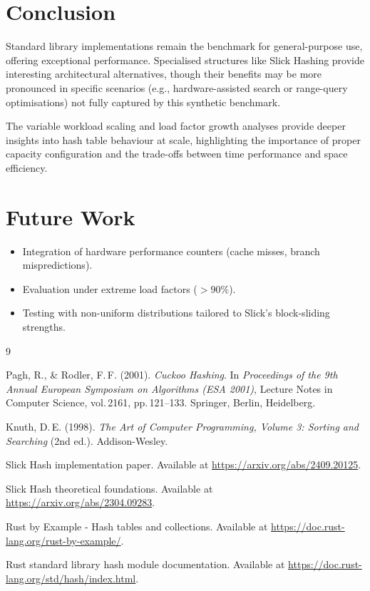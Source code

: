\documentclass[11pt,a4paper]{article}
\begin{document}
\section{Conclusion}

Standard library implementations remain the benchmark for general-purpose use, offering exceptional performance. Specialised structures like Slick Hashing provide interesting architectural alternatives, though their benefits may be more pronounced in specific scenarios (e.g., hardware-assisted search or range-query optimisations) not fully captured by this synthetic benchmark.

The variable workload scaling and load factor growth analyses provide deeper insights into hash table behaviour at scale, highlighting the importance of proper capacity configuration and the trade-offs between time performance and space efficiency.

\section{Future Work}

\begin{itemize}
  \item Integration of hardware performance counters (cache misses, branch mispredictions).
  \item Evaluation under extreme load factors ($>90\%$).
  \item Testing with non-uniform distributions tailored to Slick's block-sliding strengths.
\end{itemize}

\begin{thebibliography}{9}

Pagh, R., \& Rodler, F.\,F. (2001).
\textit{Cuckoo Hashing}.
In \textit{Proceedings of the 9th Annual European Symposium on Algorithms (ESA 2001)}, Lecture Notes in Computer Science, vol.\,2161, pp.\,121--133. Springer, Berlin, Heidelberg.

Knuth, D.\,E. (1998).
\textit{The Art of Computer Programming, Volume 3: Sorting and Searching} (2nd ed.).
Addison-Wesley.

Slick Hash implementation paper.
Available at \url{https://arxiv.org/abs/2409.20125}.

Slick Hash theoretical foundations.
Available at \url{https://arxiv.org/abs/2304.09283}.

Rust by Example - Hash tables and collections.
Available at \url{https://doc.rust-lang.org/rust-by-example/}.

Rust standard library hash module documentation.
Available at \url{https://doc.rust-lang.org/std/hash/index.html}.

\end{thebibliography}
\end{document}
